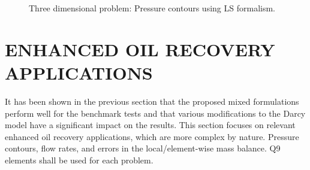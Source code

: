 \documentclass[11pt,reqno]{amsart}
\begin{document}
\begin{figure}[t!]
  \centering
  \caption{Three dimensional problem: Pressure 
    contours using LS formalism.}
  \label{Fig:Three_dimensional_pressure_LS}
\end{figure} 
\section{ENHANCED OIL RECOVERY APPLICATIONS}
\label{Ch:EOR}

It has been shown in the previous section that the 
proposed mixed formulations perform well for the 
benchmark tests and that various modifications to 
the Darcy model have a significant impact on the 
results. This section focuses on relevant enhanced 
oil recovery applications, which are more complex 
by nature. Pressure contours, flow rates, and 
errors in the local/element-wise mass balance. 
Q9 elements shall be used for each problem.
\end{document}
